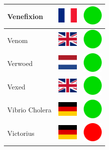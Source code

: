 \documentclass[12pt, a4paper, twoside]{report}
\begin{document}
\begin{center}
\begin{longtable}{|p{5cm}|p{2cm}|p{2cm}|}
 Venefixion                                                 & \includegraphics[width=1cm]{../4x3/fr} &   \includegraphics[width=1cm]{../likes/y} \\ \hline
 Venom                                                      & \includegraphics[width=1cm]{../4x3/gb} &   \includegraphics[width=1cm]{../likes/y} \\ \hline
 Verwoed                                                    & \includegraphics[width=1cm]{../4x3/nl} &   \includegraphics[width=1cm]{../likes/y} \\ \hline
 Vexed                                                      & \includegraphics[width=1cm]{../4x3/gb} &   \includegraphics[width=1cm]{../likes/y} \\ \hline
 Vibrio Cholera                                             & \includegraphics[width=1cm]{../4x3/de} &   \includegraphics[width=1cm]{../likes/y} \\ \hline
 Victorius                                                  & \includegraphics[width=1cm]{../4x3/de} &   \includegraphics[width=1cm]{../likes/n} \\ \hline

\end{longtable}
\end{center}
\end{document}
